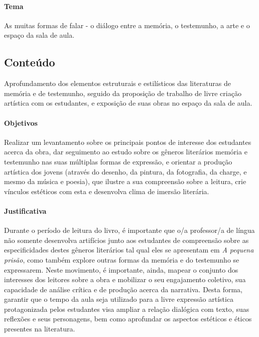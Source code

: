 \documentclass[11pt]{extarticle}
\begin{document}
\paragraph{Tema} As muitas formas de falar - o diálogo entre a memória,
o testemunho, a arte e o espaço da sala de aula.

\subsection{Conteúdo} Aprofundamento dos elementos estruturais e
estilísticos das literaturas de memória e de testemunho, seguido da
proposição de trabalho de livre criação artística com os estudantes, e
exposição de suas obras no espaço da sala de aula.

\paragraph{Objetivos} Realizar um levantamento sobre os principais pontos
de interesse dos estudantes acerca da obra, dar seguimento ao estudo
sobre os gêneros literários memória e testemunho nas suas múltiplas
formas de expressão, e orientar a produção artística dos jovens (através
do desenho, da pintura, da fotografia, da charge, e mesmo da música e
poesia), que ilustre a sua compreensão sobre a leitura, crie vínculos
estéticos com esta e desenvolva clima de imersão literária.

\paragraph{Justificativa} Durante o período de leitura do livro, é
importante que o/a professor/a de língua não somente desenvolva
artifícios junto aos estudantes de compreensão sobre as especificidades
destes gêneros literários tal qual eles se apresentam em \emph{A pequena
prisão}, como também explore outras formas da memória e do testemunho se
expressarem. Neste movimento, é importante, ainda, mapear o conjunto dos
interesses dos leitores sobre a obra e mobilizar o seu engajamento
coletivo, sua capacidade de análise crítica e de produção acerca da
narrativa. Desta forma, garantir que o tempo da aula seja utilizado para
a livre expressão artística protagonizada pelos estudantes visa ampliar
a relação dialógica com texto, suas reflexões e seus personagens, bem
como aprofundar os aspectos estéticos e éticos presentes na literatura.
\end{document}
